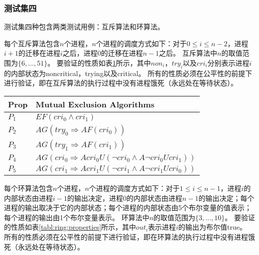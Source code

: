 

\subsubsection{测试集四}
测试集四种包含两类测试用例：互斥算法和环算法。

每个互斥算法包含$n$个进程，$n$个进程的调度方式如下：对于$0\le i\le n-2$，进程$i+1$的迁移在进程$i$之后，进程$0$的迁移在进程$n-1$之后。
互斥算法中$n$的取值范围为$\{6,...,51\}$。
要验证的性质如表\ref{tabl:mutual:properties}所示，其中$non_i$，$try_i$以及$cri_i$分别表示进程$i$的内部状态为\textsf{noncritical}，\textsf{trying}以及\textsf{critical}。
所有的性质必须在公平性的前提下进行验证，即在互斥算法的执行过程中没有进程饿死（永远处在等待状态）。

\begin{table}[h!]
	\small
	\begin{center}
		\begin{tabular}{| l | l |}
			\hline
			\textbf{Prop} & \textbf{Mutual Exclusion Algorithms}\\
			\hline
			{$P_1$} & $EF (cri_0 \wedge cri_1)$  \\
			\hline
			{$P_2$} &  $AG (try_0 \Rightarrow AF (cri_0))$\\
			\hline
			{$P_3$} &  $AG (try_1 \Rightarrow AF (cri_1))$\\
			
			\hline
			{$P_4$} &  $AG (cri_0 \Rightarrow A cri_0 U (\neg cri_0 \wedge A \neg cri_0 U cri_1))$  \\
			\hline
			{$P_5$} &  $AG (cri_1 \Rightarrow A cri_1 U (\neg cri_1 \wedge A \neg cri_1 U cri_0))$\\
			\hline
		\end{tabular}
	\end{center}
	\label{tabl:mutual:properties}
\end{table}

每个环算法包含$n$个进程，$n$个进程的调度方式如下：对于$1\le i\le n-1$，进程$i$的内部状态由进程$i-1$的输出决定，进程$0$的内部状态由进程$n-1$的输出决定；每个进程的输出取决于它的内部状态；每个进程的内部状态由5个布尔变量的值表示；每个进程的输出由1个布尔变量表示。
环算法中$n$的取值范围为$\{3,...,10\}$。
要验证的性质如表\ref{tabl:ring:properties}所示，其中$out_i$表示进程$i$的输出为布尔值\textsf{true}。
所有的性质必须在公平性的前提下进行验证，即在环算法的执行过程中没有进程饿死（永远处在等待状态）。

